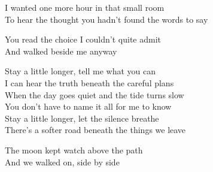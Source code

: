 \begin{lyrics}
I wanted one more hour in that small room\\
To hear the thought you hadn’t found the words to say

You read the choice I couldn’t quite admit\\
And walked beside me anyway

Stay a little longer, tell me what you can\\
I can hear the truth beneath the careful plans\\
When the day goes quiet and the tide turns slow\\
You don’t have to name it all for me to know\\
Stay a little longer, let the silence breathe\\
There’s a softer road beneath the things we leave

The moon kept watch above the path\\
And we walked on, side by side
\end{lyrics}

